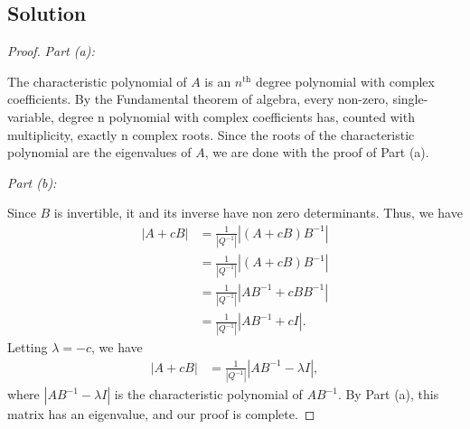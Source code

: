 \documentclass[10pt,a4paper]{article}
\makeatletter
\newcommand{\proofpart}[2]{%
  \par
  \addvspace{\medskipamount}%
  \noindent\emph{Part #1: #2}\par\nobreak
  \addvspace{\smallskipamount}%
  \@afterheading
}
\theoremstyle{definition}
\makeatother
\begin{document}
\subsection*{Solution}
\begin{proof}
\proofpart{(a)}{} The characteristic polynomial of $A$ is an $n^{\text{th}}$ degree polynomial with complex coefficients. By the Fundamental theorem of algebra, every non-zero, single-variable, degree n polynomial with complex coefficients has, counted with multiplicity, exactly n complex roots. Since the roots of the characteristic polynomial are the eigenvalues of $A$, we are done with the proof of Part (a).

\proofpart{(b)}{} Since $B$ is invertible, it and its inverse have non zero determinants. Thus, we have
\begin{align*}
|A + cB| &= \frac{1}{|Q^{-1}|}|(A + cB)B^{-1}|\\
&= \frac{1}{|Q^{-1}|}|(A + cB)B^{-1}|\\
&= \frac{1}{|Q^{-1}|}|AB^{-1} + cBB^{-1}|\\
&= \frac{1}{|Q^{-1}|}|AB^{-1} + cI|.
\end{align*}
Letting $\lambda = -c$, we have 
\begin{align*}
|A + cB| &= \frac{1}{|Q^{-1}|}|AB^{-1} - \lambda I|,
\end{align*}
where $|AB^{-1} - \lambda I|$ is the characteristic polynomial of $AB^{-1}$. By Part (a), this matrix has an eigenvalue, and our proof is complete.
\end{proof}
\end{document}
